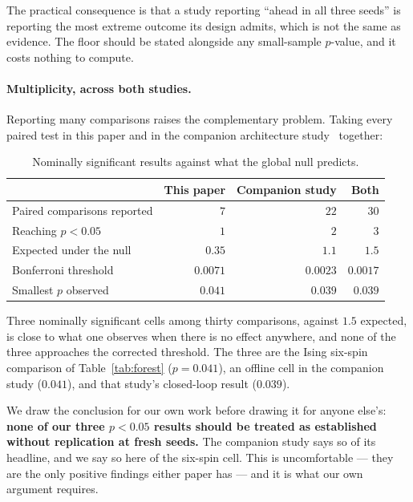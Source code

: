 \documentclass[11pt,onecolumn]{article}
\begin{document}
The practical consequence is that a study reporting ``ahead in all three
seeds'' is reporting the most extreme outcome its design admits, which
is not the same as evidence. The floor should be stated alongside any
small-sample $p$-value, and it costs nothing to compute.

\paragraph{Multiplicity, across both studies.}
Reporting many comparisons raises the complementary problem. Taking
every paired test in this paper and in the companion architecture
study~\cite{paperb} together:

\begin{table}[htb]\centering\small
\caption{Nominally significant results against what the global null
predicts.}
\label{tab:multiplicity}
\begin{tabular}{lrrr}
\toprule
& This paper & Companion study & Both \\
\midrule
Paired comparisons reported & $7$ & $22$ & $30$ \\
Reaching $p < 0.05$         & $1$ & $2$  & $3$ \\
Expected under the null     & $0.35$ & $1.1$ & $1.5$ \\
Bonferroni threshold        & $0.0071$ & $0.0023$ & $0.0017$ \\
Smallest $p$ observed       & $0.041$ & $0.039$ & $0.039$ \\
\bottomrule
\end{tabular}
\end{table}

Three nominally significant cells among thirty comparisons, against
$1.5$ expected, is close to what one observes when there is no effect
anywhere, and none of the three approaches the corrected threshold. The
three are the Ising six-spin comparison of Table~\ref{tab:forest}
($p = 0.041$), an offline cell in the companion study ($0.041$), and
that study's closed-loop result ($0.039$).

We draw the conclusion for our own work before drawing it for anyone
else's: \textbf{none of our three $p < 0.05$ results should be treated
as established without replication at fresh seeds.} The companion study
says so of its headline, and we say so here of the six-spin cell. This
is uncomfortable --- they are the only positive findings either paper
has --- and it is what our own argument requires.

\end{document}
